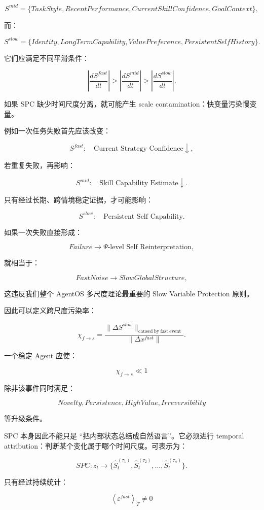 \[
S^{mid}
=
\{
TaskStyle,
RecentPerformance,
CurrentSkillConfidence,
GoalContext
\},
\]

而：

\[
S^{slow}
=
\{
Identity,
LongTermCapability,
ValuePreference,
PersistentSelfHistory
\}.
\]

它们应满足不同平滑条件：

\[
\left|
\frac{dS^{fast}}{dt}
\right|
>
\left|
\frac{dS^{mid}}{dt}
\right|
>
\left|
\frac{dS^{slow}}{dt}
\right|.
\]

如果 SPC 缺少时间尺度分离，就可能产生 scale contamination：快变量污染慢变量。

例如一次任务失败首先应该改变：

\[
S^{fast}:\quad
\text{Current Strategy Confidence}\downarrow,
\]

若重复失败，再影响：

\[
S^{mid}:\quad
\text{Skill Capability Estimate}\downarrow.
\]

只有经过长期、跨情境稳定证据，才可能影响：

\[
S^{slow}:\quad
\text{Persistent Self Capability}.
\]

如果一次失败直接形成：

\[
Failure
\rightarrow
\Psi\text{-level Self Reinterpretation},
\]

就相当于：

\[
FastNoise
\rightarrow
SlowGlobalStructure,
\]

这违反我们整个 AgentOS 多尺度理论最重要的 Slow Variable Protection 原则。

因此可以定义跨尺度污染率：

\[
\chi_{f\to s}
=
\frac{
\|\Delta S^{slow}\|_{\mathrm{caused\ by\ fast\ event}}
}{
\|\Delta x^{fast}\|
}.
\]

一个稳定 Agent 应使：

\[
\chi_{f\to s}
\ll1
\]

除非该事件同时满足：

\[
Novelty,
Persistence,
HighValue,
Irreversibility
\]

等升级条件。

SPC 本身因此不能只是 ``把内部状态总结成自然语言''。它必须进行 temporal attribution：判断某个变化属于哪个时间尺度。可表示为：

\[
SPC:
z_t
\rightarrow
\{
\hat S_t^{(\tau_1)},
\hat S_t^{(\tau_2)},
\dots,
\hat S_t^{(\tau_n)}
\}.
\]

只有经过持续统计：

\[
\left\langle
\varepsilon^{fast}
\right\rangle_T
\neq0
\]

